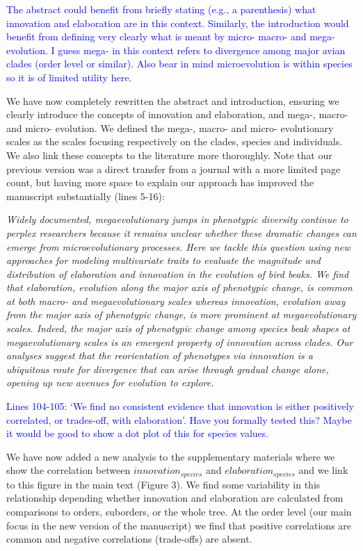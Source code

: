 \documentclass[12pt,letterpaper]{article}
\begin{document}
\newpage

\textcolor{blue}{The abstract could benefit from briefly stating (e.g., a parenthesis) what innovation and elaboration are in this context. Similarly, the introduction would benefit from defining very clearly what is meant by micro- macro- and mega-evolution. I guess mega- in this context refers to divergence among major avian clades (order level or similar). Also bear in mind microevolution is within species so it is of limited utility here.}

We have now completely rewritten the abstract and introduction, ensuring we clearly introduce the concepts of innovation and elaboration, and mega-, macro- and micro- evolution. We defined the mega-, macro- and micro- evolutionary scales as the scales focusing respectively on the clades, species and individuals. We also link these concepts to the literature more thoroughly. Note that our previous version was a direct transfer from a journal with a more limited page count, but having more space to explain our approach has improved the manuscript substantially (lines 5-16):

\noindent\textit{Widely documented, megaevolutionary jumps in phenotypic diversity continue to perplex researchers because it remains unclear whether these dramatic changes can emerge from microevolutionary processes.
Here we tackle this question using new approaches for modeling multivariate traits %
 to evaluate the magnitude and distribution of elaboration and innovation in the evolution of bird beaks.
We find that elaboration, evolution along the major axis of phenotypic change, is common at both macro- and megaevolutionary scales whereas innovation, evolution away from the major axis of phenotypic change, is more prominent at megaevolutionary scales.
Indeed, the major axis of phenotypic change among species beak shapes at megaevolutionary scales is an emergent property of innovation across clades.
Our analyses suggest that the reorientation of phenotypes via innovation is a ubiquitous route for divergence that can arise through gradual change alone, opening up new avenues for evolution to explore.}

\textcolor{blue}{Lines 104-105: ‘We find no consistent evidence that innovation is either positively correlated, or trades-off, with elaboration’. Have you formally tested this? Maybe it would be good to show a dot plot of this for species values.}

We have now added a new analysis to the supplementary materials where we show the correlation between $innovation_{species}$ and $elaboration_{species}$ and we link to this figure in the main text (Figure 3). We find some variability in this relationship depending whether innovation and elaboration are calculated from comparisons to orders, suborders, or the whole tree. At the order level (our main focus in the new version of the manuscript) we find that positive correlations are common and negative correlations (trade-offs) are absent.
\end{document}
